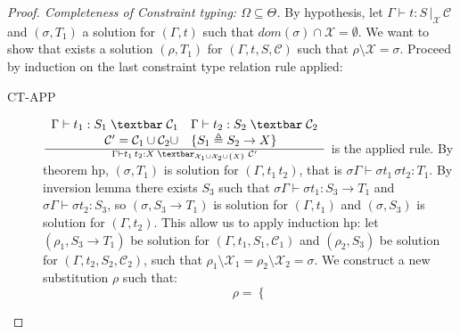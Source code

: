 \documentclass[8pt]{beamer}
\begin{document}
\begin{frame}
    \footnotesize
    \begin{proof}[Proof. Completeness of Constraint typing: 
        $\Omega \subseteq \Theta$]
        By hypothesis, let $\Gamma \vdash t : S \, |_{\mathcal{X}} \,
        \mathcal{C}$  and 
        $(\sigma, T_1)$ a solution for $(\Gamma, t)$ such that 
        $dom(\sigma)\cap\mathcal{X} = \emptyset$. We want to show
        that exists a solution $(\rho, T_1)$ for $(\Gamma, t, S,
        \mathcal{C})$ such that $\rho\setminus\mathcal{X}=\sigma$.
        Proceed by induction on the last constraint type relation rule 
        applied:
        \begin{description}
            \item[CT-APP] ${{
                \begin{array}{rl}
                  \Gamma \vdash t_{1}:S_{1} \; \textbar \;
                    \mathcal{C}_1  &
                \Gamma \vdash  t_{2}:S_{2} \; \textbar \;
                    \mathcal{C}_2  \\
                 \mathcal{C}^{\prime} = \mathcal{C}_1 \cup 
                    \mathcal{C}_2
                    \cup & \{ S_1 \triangleq S_2 \rightarrow X 
                \} \end{array}}\over
                {\Gamma \vdash t_{1} \, t_{2} : X\;
            \textbar_{\mathcal{X}_1 \cup \mathcal{X}_2 \cup
                \{X\}} \; \mathcal{C}^{\prime} }}$ is the 
                applied rule. By theorem hp, $(\sigma, T_1)$ is
                solution for $(\Gamma,t_1\,t_2)$, that is $\sigma
                \Gamma \vdash \sigma t_1 \, \sigma t_2 : T_1$. By
                inversion lemma there exists $S_3$ such that $\sigma \Gamma
                \vdash \sigma t_1 : S_3 \rightarrow T_1$ and $\sigma
                \Gamma \vdash \sigma t_2 : S_3$, so $(\sigma,
                S_3\rightarrow T_1)$ is solution for $(\Gamma, t_1)$
                and $(\sigma, S_3)$ is solution for $(\Gamma, t_2)$.
                This allow us to apply induction hp: let $(\rho_1,
                S_3\rightarrow T_1)$ be solution for $(\Gamma, t_1,
                S_1, \mathcal{C}_1)$ and $(\rho_2,
                S_3)$ be solution for $(\Gamma, t_2, S_2,
                \mathcal{C}_2)$, such that
                $\rho_1\setminus\mathcal{X}_1
                = \rho_2\setminus\mathcal{X}_2 = \sigma$. We construct
                a new substitution $\rho$ such that:
                \begin{displaymath}
                    \rho = \left \lbrace

\end{displaymath}
\end{description}
\end{proof}
\end{frame}
\end{document}
